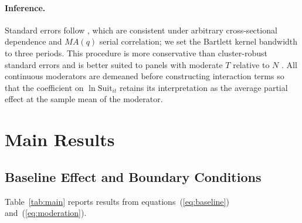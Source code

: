\documentclass[12pt]{article}
\newcommand{\suit}{\mathrm{Suit}}
\begin{document}
\paragraph{Inference.}
Standard errors follow \citet{driscoll1998consistent},
which are consistent under arbitrary cross-sectional dependence
and $MA(q)$ serial correlation; we set the Bartlett kernel
bandwidth to three periods.
This procedure is more conservative than cluster-robust standard
errors and is better suited to panels with moderate $T$ relative
to $N$ \citep{driscoll1998consistent}.
All continuous moderators are demeaned before constructing
interaction terms so that the coefficient on $\ln \suit_{it}$
retains its interpretation as the average partial effect at
the sample mean of the moderator.

\section{Main Results}
\label{sec:results}

\subsection{Baseline Effect and Boundary Conditions}

Table~\ref{tab:main} reports results from
equations~(\ref{eq:baseline}) and~(\ref{eq:moderation}).
\end{document}
